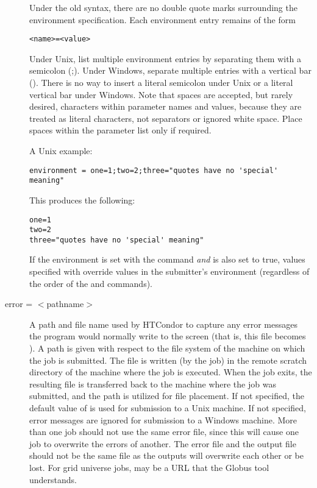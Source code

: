 \begin{description}
Under the old syntax, there are no double quote marks surrounding the
environment specification.  Each environment entry remains of the form
\begin{verbatim}
<name>=<value>
\end{verbatim}
Under Unix, list multiple environment entries by separating them with
a semicolon (;).  Under Windows, separate multiple entries with a
vertical bar (\Bar).  There is no way to insert a literal semicolon
under Unix or a literal vertical bar under Windows.  Note that spaces
are accepted, but rarely desired, characters within parameter names
and values, because they are treated as literal characters, not
separators or ignored white space.  Place spaces within the parameter
list only if required.

A Unix example:

\begin{verbatim}
environment = one=1;two=2;three="quotes have no 'special' meaning"
\end{verbatim}

This produces the following:

\begin{verbatim}
one=1
two=2
three="quotes have no 'special' meaning"
\end{verbatim}

If the environment is set with the  command \emph{and}
 is also set to true, values specified with
 override values in the submitter's environment
(regardless of the order of the  and 
commands).



\label{man-condor-submit-error}
\item[error = $<$pathname$>$]
A path and file name used by HTCondor to capture any
error messages the program would normally write to the screen
(that is, this file becomes ).
A path is given with respect to the file system of the machine
on which the job is submitted.
The file is written (by the job)
in the remote scratch directory of the machine where the job is executed. 
When the job exits, the resulting file is transferred back to the machine
where the job was submitted, and the path is utilized for file placement.
If not specified, the default value of
 is used for submission to a Unix machine.
If not specified, error messages are ignored
for submission to a Windows machine.
More than one job should not use the same error file, since
this will cause one job to overwrite the errors of another.
The error file and the output file should not be the same file
as the outputs will overwrite each other or be lost.
For grid universe jobs,  may be a URL that the Globus
tool  understands.



\end{description}
